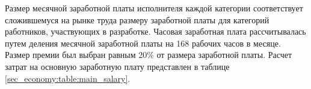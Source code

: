 Размер месячной заработной платы исполнителя каждой категории соответствует сложившемуся на рынке труда размеру заработной платы для категорий работников, участвующих в разработке\cite{programmersalaries}.
Часовая заработная плата рассчитывалась путем деления месячной заработной платы на 168 рабочих часов в месяце. Размер премии был выбран равным 20\% от размера заработной платы. Расчет затрат на основную заработную плату представлен в таблице \ref{sec_economy:table:main_salary}.





